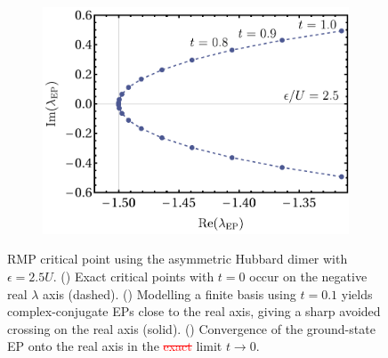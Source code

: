 \documentclass[aps,prb,reprint,noshowkeys,superscriptaddress]{revtex4-1}
\newcommand{\trash}[1]{\textcolor{red}{\sout{#1}}}
\begin{document}
\begin{figure}[t]
\begin{subfigure}{0.32\textwidth}
    \includegraphics[height=0.75\textwidth]{fig7c}
		\subcaption{\label{subfig:rmp_ep_to_cp}}
    \end{subfigure}
	\caption{%
		RMP critical point using the asymmetric Hubbard dimer with $\epsilon = 2.5 U$.
		() Exact critical points with $t=0$ occur on the negative real $\lambda$ axis (dashed).
		() Modelling a finite basis using $t=0.1$ yields complex-conjugate EPs close to the
		real axis, giving a sharp avoided crossing on the real axis (solid).
		() Convergence of the ground-state EP onto the real axis in the \trash{exact} limit $t \to 0$.
	\label{fig:RMP_cp}}
\end{figure}
\end{document}
